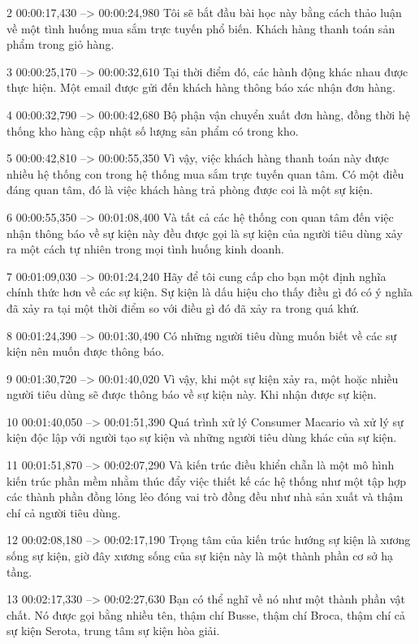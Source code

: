 2
00:00:17,430 --> 00:00:24,980
Tôi sẽ bắt đầu bài học này bằng cách thảo luận về một tình huống mua sắm trực tuyến phổ biến.  Khách hàng thanh toán sản phẩm trong giỏ hàng.

3
00:00:25,170 --> 00:00:32,610
Tại thời điểm đó, các hành động khác nhau được thực hiện.  Một email được gửi đến khách hàng thông báo xác nhận đơn hàng.

4
00:00:32,790 --> 00:00:42,680
Bộ phận vận chuyển xuất đơn hàng, đồng thời hệ thống kho hàng cập nhật số lượng sản phẩm có trong kho.

5
00:00:42,810 --> 00:00:55,350
Vì vậy, việc khách hàng thanh toán này được nhiều hệ thống con trong hệ thống mua sắm trực tuyến quan tâm.  Có một điều đáng quan tâm, đó là việc khách hàng trả phòng được coi là một sự kiện.

6
00:00:55,350 --> 00:01:08,400
Và tất cả các hệ thống con quan tâm đến việc nhận thông báo về sự kiện này đều được gọi là sự kiện của người tiêu dùng xảy ra một cách tự nhiên trong mọi tình huống kinh doanh.

7
00:01:09,030 --> 00:01:24,240
Hãy để tôi cung cấp cho bạn một định nghĩa chính thức hơn về các sự kiện.  Sự kiện là dấu hiệu cho thấy điều gì đó có ý nghĩa đã xảy ra tại một thời điểm so với điều gì đó đã xảy ra trong quá khứ.

8
00:01:24,390 --> 00:01:30,490
Có những người tiêu dùng muốn biết về các sự kiện nên muốn được thông báo.

9
00:01:30,720 --> 00:01:40,020
Vì vậy, khi một sự kiện xảy ra, một hoặc nhiều người tiêu dùng sẽ được thông báo về sự kiện này.  Khi nhận được sự kiện.

10
00:01:40,050 --> 00:01:51,390
Quá trình xử lý Consumer Macario và xử lý sự kiện độc lập với người tạo sự kiện và những người tiêu dùng khác của sự kiện.

11
00:01:51,870 --> 00:02:07,290
Và kiến ​​trúc điều khiển chẵn là một mô hình kiến ​​trúc phần mềm nhằm thúc đẩy việc thiết kế các hệ thống như một tập hợp các thành phần đồng lỏng lẻo đóng vai trò đồng đều như nhà sản xuất và thậm chí cả người tiêu dùng.

12
00:02:08,180 --> 00:02:17,190
Trọng tâm của kiến ​​trúc hướng sự kiện là xương sống sự kiện, giờ đây xương sống của sự kiện này là một thành phần cơ sở hạ tầng.

13
00:02:17,330 --> 00:02:27,630
Bạn có thể nghĩ về nó như một thành phần vật chất.  Nó được gọi bằng nhiều tên, thậm chí Busse, thậm chí Broca, thậm chí cả sự kiện Serota, trung tâm sự kiện hòa giải.

